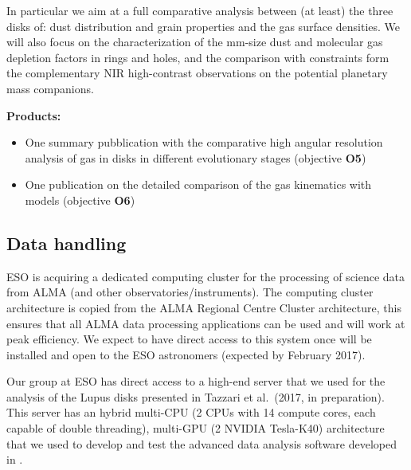 \documentclass[10pt,fleqn,twoside]{article}
\begin{document}
In particular we aim at a full comparative analysis between (at least) the three disks of: dust distribution and grain properties and the gas surface densities. We will also focus on the characterization of the mm-size dust and molecular gas depletion factors in rings and holes, and the comparison with constraints form the complementary NIR high-contrast observations on the potential planetary mass companions. 

\smallskip
{\bf Products:} 
\begin{itemize}
\item One summary pubblication with the comparative high angular resolution analysis of gas in disks in different evolutionary stages (objective {\bf O5})
\item One publication on the detailed comparison of the gas kinematics with models (objective {\bf O6})
\end{itemize}


\subsection{Data handling}

ESO is acquiring a dedicated computing cluster for the processing of science data from ALMA (and other observatories/instruments). The computing cluster architecture is copied from the ALMA Regional Centre Cluster architecture, this ensures that all ALMA data processing applications can be used and will work at peak efficiency. We expect to have direct access to this system once will be installed and open to the ESO astronomers (expected by February 2017). 

Our group at ESO has direct access to a high-end server that we used for the analysis of the Lupus disks presented in Tazzari et al.~(2017, in preparation). This server has an hybrid multi-CPU (2 CPUs with 14 compute cores, each capable of double threading), multi-GPU (2 NVIDIA Tesla-K40) architecture that we used to develop and test the advanced data analysis software developed in \citet{TazzariPhD}. 
\end{document}
